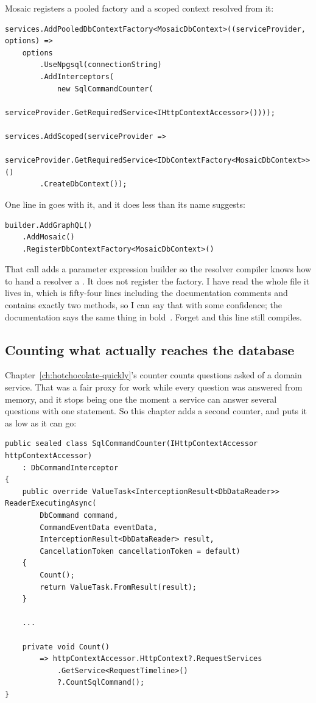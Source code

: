 Mosaic registers a pooled factory and a scoped context resolved from it:

\begin{verbatim}
services.AddPooledDbContextFactory<MosaicDbContext>((serviceProvider, options) =>
    options
        .UseNpgsql(connectionString)
        .AddInterceptors(
            new SqlCommandCounter(
                serviceProvider.GetRequiredService<IHttpContextAccessor>())));

services.AddScoped(serviceProvider =>
    serviceProvider.GetRequiredService<IDbContextFactory<MosaicDbContext>>()
        .CreateDbContext());
\end{verbatim}

%
One line in  goes with it, and it does less than its name
suggests:

\begin{verbatim}
builder.AddGraphQL()
    .AddMosaic()
    .RegisterDbContextFactory<MosaicDbContext>()
\end{verbatim}

That call adds a parameter expression builder so the resolver compiler knows how
to hand a resolver a . It does not register the factory. I
have read the whole file it lives in, which is fifty-four lines including the
documentation comments and contains exactly two methods, so I can say that with
some confidence; the documentation says the same thing in
bold~\autocite{chillicream2026efcore}. Forget 
and this line still compiles.

\subsection*{Counting what actually reaches the database}

%
Chapter~\ref{ch:hotchocolate-quickly}'s counter counts questions asked of a
domain service. That was a fair proxy for work while every question was answered
from memory, and it stops being one the moment a service can answer several
questions with one statement. So this chapter adds a second counter, and puts it
as low as it can go:

\begin{verbatim}
public sealed class SqlCommandCounter(IHttpContextAccessor httpContextAccessor)
    : DbCommandInterceptor
{
    public override ValueTask<InterceptionResult<DbDataReader>> ReaderExecutingAsync(
        DbCommand command,
        CommandEventData eventData,
        InterceptionResult<DbDataReader> result,
        CancellationToken cancellationToken = default)
    {
        Count();
        return ValueTask.FromResult(result);
    }

    ...

    private void Count()
        => httpContextAccessor.HttpContext?.RequestServices
            .GetService<RequestTimeline>()
            ?.CountSqlCommand();
}
\end{verbatim}

